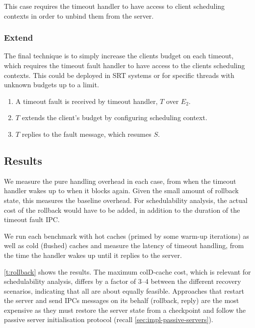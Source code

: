 This case requires the timeout handler to have access to client scheduling contexts in order to
unbind them from the server. 

\subsubsection{Extend}

The final technique is to simply increase the clients budget on each timeout, which requires the
timeout fault handler to have access to the clients scheduling contexts.
This could be deployed in \gls{SRT} systems or for specific threads with unknown budgets up to a limit. 

\begin{enumerate}\label{e:extend}
    \item A timeout fault is received by timeout handler, $T$ over $E_{2}$.
    \item $T$ extends the client's budget by configuring scheduling context.
    \item $T$ replies to the fault message, which resumes $S$.
\end{enumerate}

\subsection{Results}

We measure the pure handling overhead in each case, from when the timeout handler wakes up to when
it blocks again.  Given the small amount of rollback state, this measures the baseline overhead. For
schedulability analysis, the actual cost of the rollback would have to be added, in addition to the
duration of the timeout fault IPC. 
 
We run each benchmark with hot caches (primed by some warm-up
iterations)  as well as cold (flushed) caches and measure the 
latency of timeout handling, from the time the handler wakes up
until it replies to the server.

\autoref{t:rollback} shows the results. The maximum
colD-cache cost, which is relevant for schedulability analysis, differs by a factor of 3--4 between
the different recovery scenarios, indicating that all are about equally feasible.  Approaches that
restart the server and send \glspl{IPC} messages on its behalf (rollback, reply) are the most
expensive as they must restore the server state from a checkpoint and follow the passive server
initialisation protocol (recall \cref{sec:impl-passive-servers}). 


